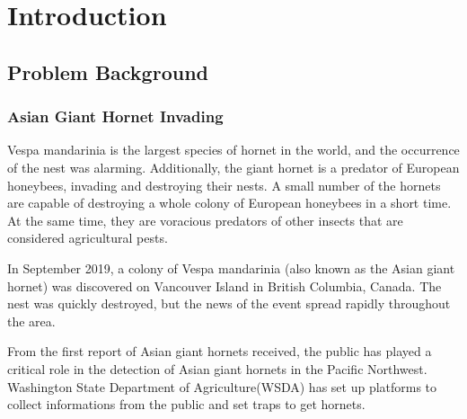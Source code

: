 \documentclass[12pt]{article}
\begin{document}
\clearpage
\pagestyle{fancy}
\tableofcontents 
\newpage
\setcounter{page}{1}






\section{Introduction}
\subsection{Problem Background}
\subsubsection{Asian Giant Hornet Invading  }
Vespa mandarinia is the largest species of hornet in the world, and the occurrence of the nest was 
alarming. Additionally, the giant hornet is a predator of European honeybees, invading and 
destroying their nests. A small number of the hornets are capable of destroying a whole colony 
of European honeybees in a short time. At the same time, they are voracious predators of other 
insects that are considered agricultural pests.

In September 2019, a colony of Vespa mandarinia (also known as the Asian giant hornet) was 
discovered on Vancouver Island in British Columbia, Canada. The nest was quickly destroyed, 
but the news of the event spread rapidly throughout the area. 

From the first report of Asian giant hornets received, the public has played a critical role in the detection of Asian giant hornets in the Pacific Northwest. Washington State Department of Agriculture(WSDA)  has set up platforms\cite{fb} to collect informations from the  public and set traps to get hornets.  
 
\end{document}
